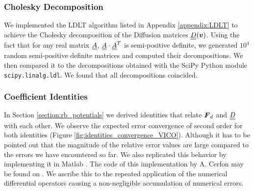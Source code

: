 \subsubsection{Cholesky Decomposition}

We implemented the LDLT algorithm listed in Appendix \ref{appendix:LDLT} to achieve the Cholesky
decomposition of the Diffusion matrices $\underline{\underline{D}}(\boldsymbol{v})$.
Using the fact that for any real matrix $\underline{\underline{A}}$, $\underline{\underline{A}} \cdot \underline{\underline{A}}^T$ is semi-positive definite, we
generated $10^4$ random semi-positive definite matrices and computed their decompositions.
We then compared it to the decompositions obtained with the SciPy \cite{2020SciPy-NMeth} Python 
module \texttt{scipy.linalg.ldl}. We found that all decompositions coincided.

\subsubsection{Coefficient Identities}

In Section \ref{section:rb_potentials} we derived identities that relate $\boldsymbol{F}_d$ and $\underline{\underline{D}}$ with each other.
We observe the expected error convergence of second order for both identities (Figure
\ref{fig:identities_convergence_VICO}). Although it has to be
pointed out that the magnitude of the relative error values are large compared to the errors we
have encountered so far.
We also replicated this behavior by implementing it in Matlab \cite{MATLAB}. The code of this implementation
by A. Cerfon may be found on \cite{tobiaStudentRepo}.
We ascribe this to the repeated application of the numerical differential operators causing a non-negligible
accumulation of numerical errors.

